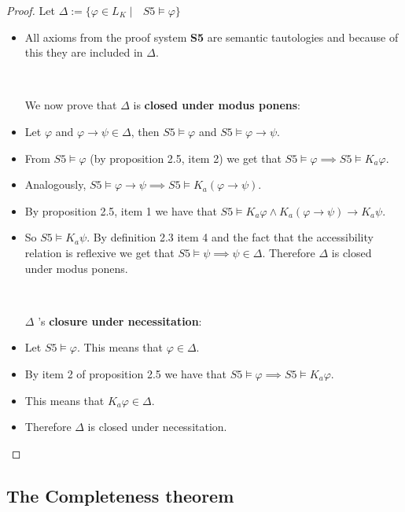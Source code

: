 \documentclass[12pt]{article}
\numberwithin{equation}{section}
\theoremstyle{definition}
\theoremstyle{definition}
\theoremstyle{remark}
\begin{document}
\begin{proof}

Let $\Delta := \{  \varphi \in L_K \mid \text{ } S5 \models \varphi \} $ 
\begin{itemize}
\item All axioms from the proof system \textbf{S5} are semantic tautologies and because of this they are included in $\Delta$.

~

We now prove that $\Delta$ is \textbf{closed under modus ponens}:

\item Let $\varphi$ and $\varphi \rightarrow \psi \in \Delta$, then $S5 \models \varphi$ and $S5 \models \varphi \rightarrow \psi$.

\item From $S5 \models \varphi$ (by proposition 2.5, item 2) we get that $S5 \models \varphi \implies S5 \models K_a \varphi$. 

\item Analogously, $S5 \models \varphi \rightarrow \psi \implies S5 \models K_a( \varphi \rightarrow \psi)$.

\item By proposition 2.5, item 1 we have that $S5 \models K_a \varphi\land K_a(\varphi \rightarrow \psi) \rightarrow K_a\psi$. 

\item So $S5 \models K_a \psi$. By definition 2.3 item 4 and the fact that the accessibility relation is reflexive we get that $S5 \models \psi \implies \psi \in \Delta$. Therefore $\Delta$ is closed under modus ponens.

~

$\Delta$ 's \textbf{closure under necessitation}:

\item Let $S5 \models \varphi$. This means that $\varphi \in \Delta$.

\item By item 2 of proposition 2.5 we have that $S5 \models \varphi \implies S5 \models K_a \varphi$.
\item This means that $K_a\varphi \in \Delta$.
\item Therefore $\Delta$ is closed under necessitation.
\end{itemize}

\end{proof}

\subsection{The Completeness theorem}
\end{document}
